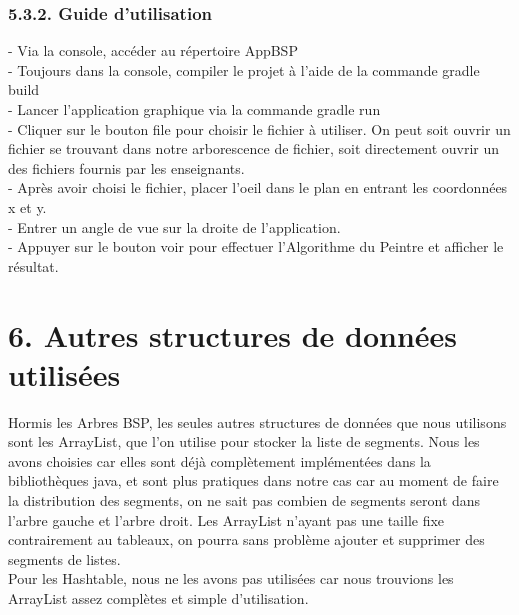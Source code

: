 \documentclass[a4paper,12pt]{report}	%
\begin{document}
    {\subsubsection*{5.3.2. Guide d'utilisation}}
	   - Via la console, accéder au répertoire AppBSP\\
\indent - Toujours dans la console, compiler le projet à l'aide de la commande gradle build \\
\indent - Lancer l'application graphique via la commande gradle run\\
\indent - Cliquer sur le bouton file pour choisir le fichier à utiliser. On peut soit ouvrir un fichier se trouvant dans notre arborescence de fichier, soit directement ouvrir un des fichiers fournis par les enseignants. \\
\indent - Après avoir choisi le fichier, placer l'oeil dans le plan en entrant les coordonnées
x et y.\\
\indent - Entrer un angle de vue sur la droite de l'application.\\
\indent - Appuyer sur le bouton voir pour effectuer l'Algorithme du Peintre et afficher le résultat.\\
	
	
	\newpage 
	{\section*{6. Autres structures de données utilisées}}
	Hormis les Arbres BSP, les seules autres structures de données que nous utilisons sont les ArrayList, que l'on utilise pour stocker la liste de segments. Nous les avons choisies car elles sont déjà complètement implémentées dans la bibliothèques java, et sont plus pratiques dans notre cas car au moment de faire la distribution des segments, on ne sait pas combien de segments seront dans l'arbre gauche et l'arbre droit. Les ArrayList n'ayant pas une taille fixe contrairement au tableaux, on pourra sans problème ajouter et supprimer des segments de listes.\\
	Pour les Hashtable, nous ne les avons pas utilisées car nous trouvions les ArrayList assez complètes et simple d'utilisation.\\
			
\end{document}
